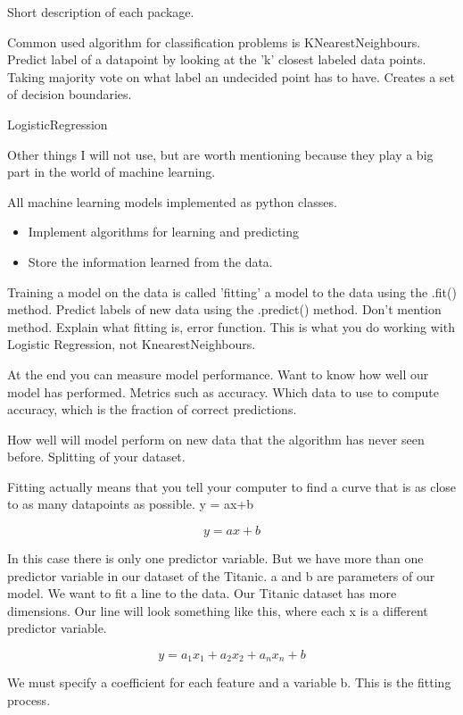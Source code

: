 \documentclass[11pt]{article}
\begin{document}
Short description of each package. 

Common used algorithm for classification problems is KNearestNeighbours. Predict label of a datapoint by looking at the 'k' closest labeled data points. Taking majority vote on what label an undecided point has to have. Creates a set of decision boundaries. 


LogisticRegression

Other things I will not use, but are worth mentioning because they play a big part in the world of machine learning. 

All machine learning models implemented as python classes.
\begin{itemize}
\item Implement algorithms for learning and predicting
\item Store the information learned from the data.
\end{itemize}
Training a model on the data is called 'fitting' a model to the data using the .fit() method. Predict labels of new data using the .predict() method. Don't mention method. Explain what fitting is, error function. This is what you do working with Logistic Regression, not KnearestNeighbours.

At the end you can measure model performance. Want to know how well our model has performed. Metrics such as accuracy. Which data to use to compute accuracy, which is the fraction of correct predictions. 

How well will model perform on new data that the algorithm has never seen before. Splitting of your dataset. 

Fitting actually means that you tell your computer to find a curve that is as close to as many datapoints as possible. y = ax+b

\begin{equation}
y=ax+b
\end{equation} 


In this case there is only one predictor variable. But we have more than one predictor variable in our dataset of the Titanic. a and b are parameters of our model. We want to fit a line to the data. Our Titanic dataset has more dimensions. Our line will look something like this, where each x is a different predictor variable. 

\begin{equation}
y=a_1x_1+a_2x_2+a_nx_n+b 
\end{equation}


We must specify a coefficient for each feature and a variable b. This is the fitting process. 
\end{document}
